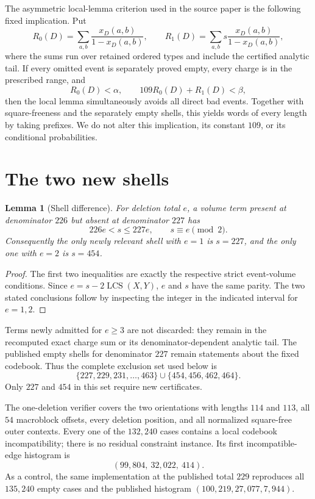 \documentclass[11pt]{article}
\newtheorem{lemma}[theorem]{Lemma}
\newcommand{\LCS}{\operatorname{LCS}}
\begin{document}
The asymmetric local-lemma criterion used in the source paper
\cite{ErdosLovasz1975,XuEtAl2026} is the following fixed implication.  Put
\[
 R_0(D)=\sum_{a,b}\frac{x_D(a,b)}{1-x_D(a,b)},\qquad
 R_1(D)=\sum_{a,b}s\frac{x_D(a,b)}{1-x_D(a,b)},
\]
where the sums run over retained ordered types and include the certified
analytic tail.  If every omitted event is separately proved empty, every
charge is in the prescribed range, and
\begin{equation}\label{eq:lll}
             R_0(D)<\alpha,\qquad 109R_0(D)+R_1(D)<\beta,
\end{equation}
then the local lemma simultaneously avoids all direct bad events.  Together
with square-freeness and the separately empty shells, this yields words of
every length by taking prefixes.  We do not alter this implication, its
constant $109$, or its conditional probabilities.

\section{The two new shells}

\begin{lemma}[Shell difference]\label{lem:difference}
For deletion total $e$, a volume term present at denominator $226$ but absent
at denominator $227$ has
\[
       226e<s\leq227e,\qquad s\equiv e\pmod 2.
\]
Consequently the only newly relevant shell with $e=1$ is $s=227$, and the
only one with $e=2$ is $s=454$.
\end{lemma}

\begin{proof}
The first two inequalities are exactly the respective strict event-volume
conditions.  Since $e=s-2\LCS(X,Y)$, $e$ and $s$ have the same parity.  The
two stated conclusions follow by inspecting the integer in the indicated
interval for $e=1,2$.
\end{proof}

Terms newly admitted for $e\geq3$ are not discarded: they remain in the
recomputed exact charge sum or its denominator-dependent analytic tail.  The
published empty shells for denominator $227$ remain statements about the
fixed codebook.  Thus the complete exclusion set used below is
\begin{equation}\label{eq:exclusions}
 \{227,229,231,\ldots,463\}\cup\{454,456,462,464\}.
\end{equation}
Only $227$ and $454$ in this set require new certificates.

The one-deletion verifier covers the two orientations with lengths $114$ and
$113$, all $54$ macroblock offsets, every deletion position, and all
normalized square-free outer contexts.  Every one of the $132{,}240$ cases
contains a local codebook incompatibility; there is no residual constraint
instance.  Its first incompatible-edge histogram is
\[
                 (99{,}804,\ 32{,}022,\ 414).
\]
As a control, the same implementation at the published total $229$ reproduces
all $135{,}240$ empty cases and the published histogram
$(100{,}219,27{,}077,7{,}944)$.
\end{document}
